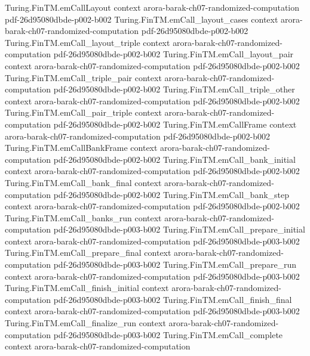 \begin{theorem}
\proofstep
  {Turing.FinTM.emCallLayout}
  {context}
  {arora-barak-ch07-randomized-computation}
  {pdf-26d95080dbde-p002-b002}
\proofstep
  {Turing.FinTM.emCall_layout_cases}
  {context}
  {arora-barak-ch07-randomized-computation}
  {pdf-26d95080dbde-p002-b002}
\proofstep
  {Turing.FinTM.emCall_layout_triple}
  {context}
  {arora-barak-ch07-randomized-computation}
  {pdf-26d95080dbde-p002-b002}
\proofstep
  {Turing.FinTM.emCall_layout_pair}
  {context}
  {arora-barak-ch07-randomized-computation}
  {pdf-26d95080dbde-p002-b002}
\proofstep
  {Turing.FinTM.emCall_triple_pair}
  {context}
  {arora-barak-ch07-randomized-computation}
  {pdf-26d95080dbde-p002-b002}
\proofstep
  {Turing.FinTM.emCall_triple_other}
  {context}
  {arora-barak-ch07-randomized-computation}
  {pdf-26d95080dbde-p002-b002}
\proofstep
  {Turing.FinTM.emCall_pair_triple}
  {context}
  {arora-barak-ch07-randomized-computation}
  {pdf-26d95080dbde-p002-b002}
\proofstep
  {Turing.FinTM.emCallFrame}
  {context}
  {arora-barak-ch07-randomized-computation}
  {pdf-26d95080dbde-p002-b002}
\proofstep
  {Turing.FinTM.emCallBankFrame}
  {context}
  {arora-barak-ch07-randomized-computation}
  {pdf-26d95080dbde-p002-b002}
\proofstep
  {Turing.FinTM.emCall_bank_initial}
  {context}
  {arora-barak-ch07-randomized-computation}
  {pdf-26d95080dbde-p002-b002}
\proofstep
  {Turing.FinTM.emCall_bank_final}
  {context}
  {arora-barak-ch07-randomized-computation}
  {pdf-26d95080dbde-p002-b002}
\proofstep
  {Turing.FinTM.emCall_bank_step}
  {context}
  {arora-barak-ch07-randomized-computation}
  {pdf-26d95080dbde-p002-b002}
\proofstep
  {Turing.FinTM.emCall_banks_run}
  {context}
  {arora-barak-ch07-randomized-computation}
  {pdf-26d95080dbde-p003-b002}
\proofstep
  {Turing.FinTM.emCall_prepare_initial}
  {context}
  {arora-barak-ch07-randomized-computation}
  {pdf-26d95080dbde-p003-b002}
\proofstep
  {Turing.FinTM.emCall_prepare_final}
  {context}
  {arora-barak-ch07-randomized-computation}
  {pdf-26d95080dbde-p003-b002}
\proofstep
  {Turing.FinTM.emCall_prepare_run}
  {context}
  {arora-barak-ch07-randomized-computation}
  {pdf-26d95080dbde-p003-b002}
\proofstep
  {Turing.FinTM.emCall_finish_initial}
  {context}
  {arora-barak-ch07-randomized-computation}
  {pdf-26d95080dbde-p003-b002}
\proofstep
  {Turing.FinTM.emCall_finish_final}
  {context}
  {arora-barak-ch07-randomized-computation}
  {pdf-26d95080dbde-p003-b002}
\proofstep
  {Turing.FinTM.emCall_finalize_run}
  {context}
  {arora-barak-ch07-randomized-computation}
  {pdf-26d95080dbde-p003-b002}
\proofstep
  {Turing.FinTM.emCall_complete}
  {context}
  {arora-barak-ch07-randomized-computation}

\end{theorem}
